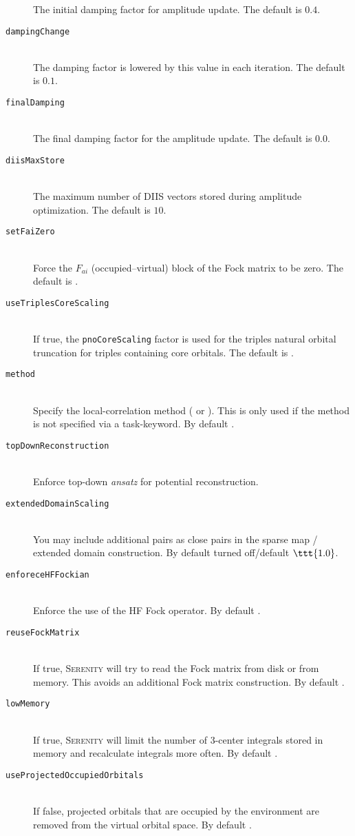\begin{description}
    The initial damping factor for amplitude update. The default is $0.4$.
    \item [\texttt{dampingChange}]\hfill \\
    The damping factor is lowered by this value in each iteration. The default is $0.1$.
    \item [\texttt{finalDamping}]\hfill \\
    The final damping factor for the amplitude update. The default is $0.0$.
    \item [\texttt{diisMaxStore}]\hfill \\
    The maximum number of DIIS vectors stored during amplitude optimization. The default is $10$.
    \item [\texttt{setFaiZero}]\hfill \\
    Force the $F_{ai}$ (occupied--virtual) block of the Fock matrix to be zero. The default is .
    \item [\texttt{useTriplesCoreScaling}]\hfill \\
    If true, the \texttt{pnoCoreScaling} factor is used for the triples natural orbital truncation for
    triples containing core orbitals. The default is .
    \item [\texttt{method}]\hfill \\
    Specify the local-correlation method ( or ). This is only used if the method
    is not specified via a task-keyword. By default .
    \item [\texttt{topDownReconstruction}]\hfill \\
    Enforce top-down \textit{ansatz} for potential reconstruction.
    \item [\texttt{extendedDomainScaling}]\hfill \\
    You may include additional pairs as close pairs in the sparse map / extended
    domain construction. By default turned off/default $\ttt{1.0}$.
    \item [\texttt{enforeceHFFockian}]\hfill \\
    Enforce the use of the HF Fock operator. By default .
    \item [\texttt{reuseFockMatrix}]\hfill \\
    If true, \textsc{Serenity} will try to read the Fock matrix from disk or from memory.
    This avoids an additional Fock matrix construction. By default .
    \item [\texttt{lowMemory}]\hfill \\
    If true, \textsc{Serenity} will limit the number of 3-center integrals stored in memory
    and recalculate integrals more often. By default .
    \item [\texttt{useProjectedOccupiedOrbitals}]\hfill \\
    If false, projected orbitals that are occupied by the environment are removed from the virtual orbital space. By default .
 \end{description}

